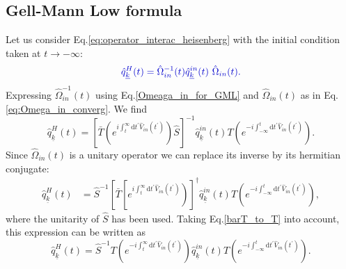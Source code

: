 \documentclass[12pt, titlepage]{article}
\begin{document}
\subsection{Gell-Mann Low formula}
Let us consider Eq.\enskip\eqref{eq:operator_interac_heisenberg} with the initial condition taken at $ t \rightarrow - \infty $:
\begin{equation}\textcolor[RGB]{0,0,204}{
\hat{q}^{H}_{\underline{k}}(t)=\hat{\Omega}_{in}^{-1}(t)\hat{q}^{in}_{\underline{k}}(t)\ \hat{\Omega}_{in}(t).
}
\end{equation}
Expressing $ \hat{\Omega}^{-1}_{in}(t) $ using Eq.\enskip\eqref{Omeaga_in_for_GML} and $ \hat{\Omega}_{in}(t) $ as in Eq.\enskip\eqref{eq:Omega_in_converg}. We find 
\begin{equation}
\hat{q}^{H}_{\underline{k}}(t)
=\left[ 
\bar{T}
\left( 
 e^{i\int_{t}^{\infty}\mathrm{d}t^{\prime} \hat{V}_{in}(t^{\prime})}
\right) 
\hat{S}
\right]^{-1}
\hat{q}^{in}_{\underline{k}}(t)
T
\left( 
 e^{-i\int_{-\infty}^{t}\mathrm{d}t^{\prime} \hat{V}_{in}(t^{\prime})}
\right) 
.
\end{equation}
Since $ \hat{\Omega}_{in}(t) $ is a unitary operator we can replace its inverse by its hermitian conjugate:
\begin{equation}
\begin{split}
\hat{q}^{H}_{\underline{k}}(t)
&=
\hat{S}^{-1}\left[ 
\bar{T}
\left[ 
 e^{i\int_{t}^{\infty}\mathrm{d}t^{\prime} \hat{V}_{in}(t^{\prime})}
\right) 
\right]^{\dagger}
\hat{q}^{in}_{\underline{k}}(t)
T
\left( 
 e^{-i\int_{-\infty}^{t}\mathrm{d}t^{\prime} \hat{V}_{in}(t^{\prime})}
\right) 
,
\end{split}
\end{equation}
where the unitarity of $ \hat{S} $ has been used.
Taking Eq.\enskip\eqref{barT_to_T} into account, this expression can be written as
\begin{equation}\label{1st_expression_for_Omega_H}
\hat{q}^{H}_{\underline{k}}(t)
=
\hat{S}^{-1} 
T
\left( 
 e^{-i\int_{t}^{\infty}\mathrm{d}t^{\prime} \hat{V}_{in}(t^{\prime})}
\right)
\hat{q}^{in}_{\underline{k}}(t)
T
\left( 
 e^{-i\int_{-\infty}^{t}\mathrm{d}t^{\prime} \hat{V}_{in}(t^{\prime})}
\right) .
\end{equation}
\end{document}
